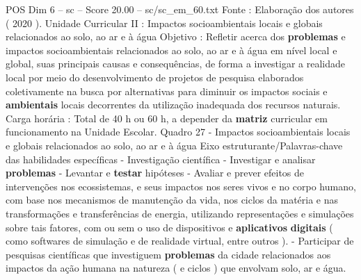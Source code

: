 \begin{textsample}{POS Dim 6 – sc – Score 20.00 – sc/sc\_em\_60.txt}
Fonte : Elaboração dos autores ( 2020 ).
Unidade Curricular II : Impactos socioambientais locais e globais relacionados ao solo, ao ar e à água Objetivo : Refletir acerca dos \textbf{problemas} e impactos socioambientais relacionados ao solo, ao ar e à água em nível local e global, suas principais causas e consequências, de forma a investigar a realidade local por meio do desenvolvimento de projetos de pesquisa elaborados coletivamente na busca por alternativas para diminuir os impactos sociais e \textbf{ambientais} locais decorrentes da utilização inadequada dos recursos naturais.
Carga horária : Total de 40 h ou 60 h, a depender da \textbf{matriz} curricular em funcionamento na Unidade Escolar.
Quadro 27 - Impactos socioambientais locais e globais relacionados ao solo, ao ar e à água Eixo estruturante/Palavras-chave das habilidades específicas - Investigação científica - Investigar e analisar \textbf{problemas} - Levantar e \textbf{testar} hipóteses - Avaliar e prever efeitos de intervenções nos ecossistemas, e seus impactos nos seres vivos e no corpo humano, com base nos mecanismos de manutenção da vida, nos ciclos da matéria e nas transformações e transferências de energia, utilizando representações e simulações sobre tais fatores, com ou sem o uso de dispositivos e \textbf{aplicativos} \textbf{digitais} ( como softwares de simulação e de realidade virtual, entre outros ). - Participar de pesquisas científicas que investiguem \textbf{problemas} da cidade relacionados aos impactos da ação humana na natureza ( e ciclos ) que envolvam solo, ar e água.

\end{textsample}
